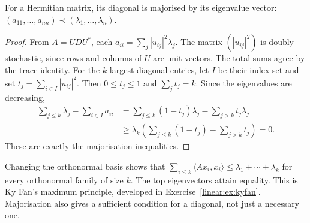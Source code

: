 \begin{theorem}[Schur, 1923]\label{linear:thm:schurmaj}
For a Hermitian matrix, its diagonal is majorised by its eigenvalue vector: $(a_{11},\dots,a_{nn})\prec(\lambda_1,\dots,\lambda_n)$.
\end{theorem}
\begin{proof}
From $A=UDU^*$, each $a_{ii}=\sum_j|u_{ij}|^2\lambda_j$. The matrix $(|u_{ij}|^2)$ is doubly stochastic, since rows and columns of $U$ are unit vectors. The total sums agree by the trace identity. For the $k$ largest diagonal entries, let $I$ be their index set and set $t_j=\sum_{i\in I}|u_{ij}|^2$. Then $0\le t_j\le1$ and $\sum_jt_j=k$. Since the eigenvalues are decreasing,
\[\begin{aligned}
\sum_{j\le k}\lambda_j-\sum_{i\in I}a_{ii}
&=\sum_{j\le k}(1-t_j)\lambda_j-\sum_{j>k}t_j\lambda_j\\
&\ge\lambda_k\left(\sum_{j\le k}(1-t_j)-\sum_{j>k}t_j\right)=0.
\end{aligned}\]
These are exactly the majorisation inequalities.
\end{proof}

Changing the orthonormal basis shows that $\sum_{i\le k}\langle Ax_i,x_i\rangle\le\lambda_1+\cdots+\lambda_k$ for every orthonormal family of size $k$. The top eigenvectors attain equality. This is Ky Fan's maximum principle, developed in Exercise~\ref{linear:ex:kyfan}. Majorisation also gives a sufficient condition for a diagonal, not just a necessary one.

